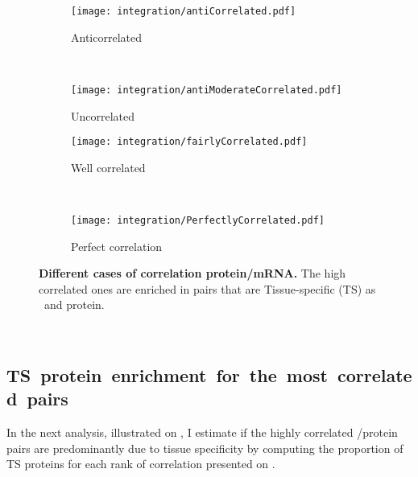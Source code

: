 \begin{figure}[!htb]
    \begin{subfigure}[h]{0.5\textwidth}
        \centering \texttt{[image: integration/antiCorrelated.pdf]}
        \caption{Anticorrelated}\label{fig:caseAnticor}
    \end{subfigure}~%
    \begin{subfigure}[h]{0.5\textwidth}
        \centering \texttt{[image: integration/antiModerateCorrelated.pdf]}
        \caption{Uncorrelated}\label{fig:caseUncor}
    \end{subfigure}
    \vspace{2mm}

    \begin{subfigure}[h]{0.5\textwidth}
        \centering \texttt{[image: integration/fairlyCorrelated.pdf]}
        \caption{Well correlated}\label{fig:caseFairlyCor}
    \end{subfigure}~%
    \begin{subfigure}[h]{0.5\textwidth}
        \centering \texttt{[image: integration/PerfectlyCorrelated.pdf]}
        \caption{Perfect correlation}\label{fig:casePerfectlyCor}
    \end{subfigure}
    \caption[Different cases of correlation
    protein/mRNA]{\label{fig:caseGene}\textbf{Different cases of correlation
    protein/mRNA.} The high correlated ones are enriched in pairs that are
    Tissue-specific (TS) as \mRNA\ and protein.}
\end{figure}

\FloatBarrier\
\subsection{TS~protein~enrichment~for~the~most~correlated~pairs}
In the next analysis, illustrated on \Cref{fig:Spe_Cor},
I estimate if the highly correlated \mRNA/protein pairs
are predominantly due to tissue specificity
by computing the proportion of \gls{TS} proteins
for each rank of correlation presented on .

